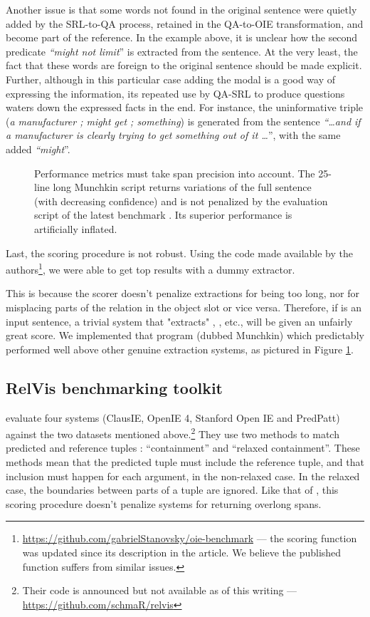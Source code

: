 \pdfoutput=1 \documentclass[11pt, a4paper]{article}
\begin{document}
Another issue is that some words not found in the original sentence were quietly added
by the SRL-to-QA process, retained in the QA-to-OIE transformation, and
become part of the reference. In the example above, it is unclear how the
second predicate \emph{``might not limit}'' is extracted from the sentence. At the very least, the fact that these words are foreign to the original sentence should be made explicit. Further,
although in this particular case adding the modal is a good way of expressing
the information, its repeated use by QA-SRL to produce questions waters down
the expressed facts in the end. For instance, the uninformative triple (\emph{a
manufacturer ; might get ; something}) is generated from the sentence \emph{``\ldots{}and
if a manufacturer is clearly trying to get something out of it \ldots{}}'', with the
same added \emph{``might}''.

\begin{figure}[ht!]
  \centering
  \caption{Performance metrics must take span precision into account. The
    25-line long Munchkin script returns variations of the full sentence (with
    decreasing confidence) and is not penalized by the evaluation script of the
    latest benchmark \cite{Stanovsky2016EMNLP}. Its superior performance is
    artificially inflated.}
  \label{fig-munchkin}
\end{figure}

Last, the scoring procedure is not robust. Using the code made available by the
authors\footnote{\url{https://github.com/gabrielStanovsky/oie-benchmark} --- the scoring
function was updated since its description in the article. We
believe the published function suffers from similar issues.}, we were
able to get top results with a dummy extractor.

This is because the scorer doesn't penalize extractions for being too long, nor for
misplacing parts of the relation in the object slot or vice versa. Therefore,
if  is an input sentence, a trivial system that "extracts"
, , etc., will be given
an unfairly great score. We implemented that program (dubbed Munchkin) which
predictably performed well above other genuine extraction systems, as pictured
in Figure \ref{fig-munchkin}.

\subsection{RelVis benchmarking toolkit}
\label{sec:org80db224}
\citet{W17-5402} evaluate four systems (ClausIE, OpenIE 4, Stanford Open IE and
PredPatt) against the two datasets mentioned above.\footnote{Their code is announced but not
available as of this writing --- \url{https://github.com/schmaR/relvis}} They
use two methods to match predicted and reference tuples : ``containment'' and
``relaxed containment''.  These methods mean that the predicted tuple must
include the reference tuple, and that inclusion must happen for each argument,
in the non-relaxed case. In the relaxed case, the boundaries between parts of a
tuple are ignored. Like that of \citet{Stanovsky2016EMNLP}, this scoring
procedure doesn't penalize systems for returning overlong spans.
\end{document}
